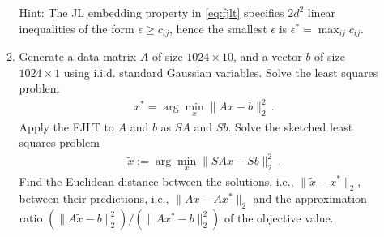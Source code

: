 \begin{enumerate}
\begin{enumerate}
    Hint: The JL embedding property in \eqref{eq:fjlt} specifies $2d^2$ linear inequalities of the form $\epsilon \ge c_{ij}$, hence the smallest $\epsilon$ is $\epsilon^*=\max_{ij} c_{ij}$.
    \item Generate a data matrix $A$ of size $1024\times 10$, and a vector $b$ of size $1024\times 1$ using i.i.d. standard Gaussian variables. Solve the least squares problem
    \begin{align*}
        x^* = \arg \min_x \|Ax-b\|_2^2\,.
    \end{align*}
    Apply the FJLT to $A$ and $b$ as $SA$ and $Sb$. Solve the sketched least squares problem
        \begin{align*}
             \tilde x := \arg\min_x \|SAx-Sb\|_2^2\,.
        \end{align*}
    Find the Euclidean distance between the solutions, i.e., $\|\tilde x - x^*\|_2$, between their predictions, i.e., $\|A\tilde x - Ax^*\|_2$  and the approximation ratio $(\| A\tilde x -b \|_2^2)/(\| A x^* -b \|_2^2) $ of the objective value.   
\end{enumerate}
\solution{
}
\end{enumerate}
